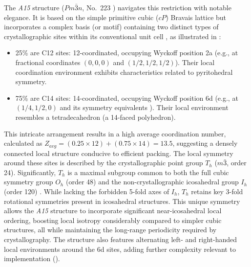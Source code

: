 \documentclass[10pt]{article}
\def\AAAB{\textit{A15}}
\begin{document}
The \AAAB{} structure ($Pm\bar{3}n$, No.~223 \cite{ITCVolumeA2016}) navigates this restriction with notable elegance. It is based on the simple primitive cubic ($cP$) Bravais lattice but incorporates a complex basis (or motif) containing two distinct types of crystallographic sites within its conventional unit cell \cite{FrankKasper1958, FrankKasper1959}, as illustrated in :
\begin{itemize} \itemsep0pt
    \item 25\% are C12 sites: 12-coordinated, occupying Wyckoff position 2a (e.g., at fractional coordinates $(0, 0, 0)$ and $(1/2, 1/2, 1/2)$). Their local coordination environment exhibits characteristics related to pyritohedral symmetry.
    \item 75\% are C14 sites: 14-coordinated, occupying Wyckoff position 6d (e.g., at $(1/4, 1/2, 0)$ and its symmetry equivalents \cite{ITCVolumeA2016}). Their local environment resembles a tetradecahedron (a 14-faced polyhedron).
\end{itemize}
This intricate arrangement results in a high average coordination number, calculated as $Z_{avg} = (0.25 \times 12) + (0.75 \times 14) = 13.5$, suggesting a densely connected local structure conducive to efficient packing. The local symmetry around these sites is described by the crystallographic point group $T_h$ ($m\bar{3}$, order 24). Significantly, $T_h$ is a maximal subgroup common to both the full cubic symmetry group $O_h$ (order 48) and the non-crystallographic icosahedral group $I_h$ (order 120) \cite{CoxeterMoser1972}. While lacking the forbidden 5-fold axes of $I_h$, $T_h$ retains key 3-fold rotational symmetries present in icosahedral structures. This unique symmetry allows the \AAAB{} structure to incorporate significant near-icosahedral local ordering, boosting local isotropy considerably compared to simpler cubic structures, all while maintaining the long-range periodicity required by crystallography. The structure also features alternating left- and right-handed local environments around the 6d sites, adding further complexity relevant to implementation ().
\end{document}

